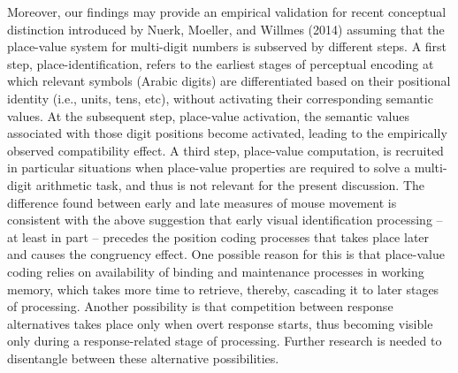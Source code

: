 \documentclass[english,man]{apa6}
\theoremstyle{definition}
\theoremstyle{definition}
\theoremstyle{definition}
\theoremstyle{remark}
\begin{document}
Moreover, our findings may provide an empirical validation for recent
conceptual distinction introduced by Nuerk, Moeller, and Willmes (2014)
assuming that the place-value system for multi-digit numbers is
subserved by different steps. A first step, place-identification, refers
to the earliest stages of perceptual encoding at which relevant symbols
(Arabic digits) are differentiated based on their positional identity
(i.e., units, tens, etc), without activating their corresponding
semantic values. At the subsequent step, place-value activation, the
semantic values associated with those digit positions become activated,
leading to the empirically observed compatibility effect. A third step,
place-value computation, is recruited in particular situations when
place-value properties are required to solve a multi-digit arithmetic
task, and thus is not relevant for the present discussion. The
difference found between early and late measures of mouse movement is
consistent with the above suggestion that early visual identification
processing -- at least in part -- precedes the position coding processes
that takes place later and causes the congruency effect. One possible
reason for this is that place-value coding relies on availability of
binding and maintenance processes in working memory, which takes more
time to retrieve, thereby, cascading it to later stages of processing.
Another possibility is that competition between response alternatives
takes place only when overt response starts, thus becoming visible only
during a response-related stage of processing. Further research is
needed to disentangle between these alternative possibilities.
\end{document}
